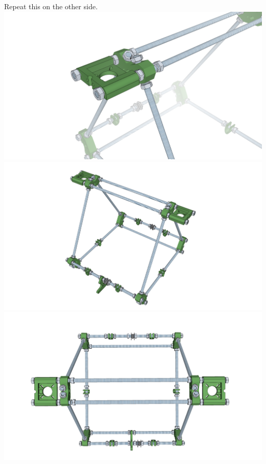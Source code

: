 \documentclass[twoside,openany,a4paper,titlepage]{memoir}
\begin{document}
	\section{}
	Repeat this on the other side.\\
	\includegraphics[width=1\linewidth]{graphics/ch4_6_1.png}
	\includegraphics[width=1\linewidth]{graphics/ch4_6_2.png}
	\includegraphics[width=1\linewidth]{graphics/ch4_6_3.png}
	
\end{document}
